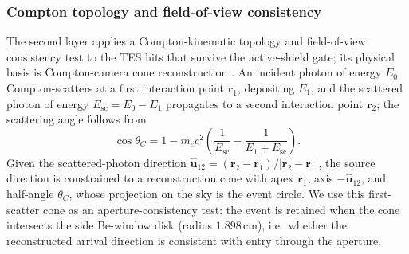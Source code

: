 \documentclass[11pt]{article}
\begin{document}
\subsubsection{Compton topology and field-of-view consistency}

The second layer applies a Compton-kinematic topology and field-of-view
consistency test to the TES hits that survive the active-shield gate; its
physical basis is Compton-camera cone reconstruction \cite{Zoglauer2006}. An
incident photon of energy $E_0$ Compton-scatters at a first interaction point
$\mathbf r_1$, depositing $E_1$, and the scattered photon of energy
$E_{\mathrm{sc}}=E_0-E_1$ propagates to a second interaction point $\mathbf r_2$;
the scattering angle follows from
\begin{equation}
  \cos\theta_C =
  1 - m_ec^2\left(\frac{1}{E_{\mathrm{sc}}}
  - \frac{1}{E_1+E_{\mathrm{sc}}}\right).
\end{equation}
Given the scattered-photon direction
$\hat{\mathbf u}_{12}=(\mathbf r_2-\mathbf r_1)/|\mathbf r_2-\mathbf r_1|$, the
source direction is constrained to a reconstruction cone with apex $\mathbf r_1$,
axis $-\hat{\mathbf u}_{12}$, and half-angle $\theta_C$, whose projection on the
sky is the event circle. We use this first-scatter cone as an aperture-consistency
test: the event is retained when the cone intersects the side Be-window disk (radius
$1.898\,\mathrm{cm}$), i.e.\ whether the reconstructed arrival direction is
consistent with entry through the aperture.
\end{document}
